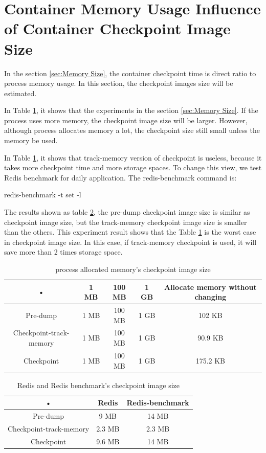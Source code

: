 \section{Container Memory Usage Influence of Container Checkpoint Image Size}
In the section \ref{sec:Memory Size}, the container checkpoint time is direct ratio to process memory usage. In this section, the checkpoint images size will be estimated.

In Table \ref{table:process image size}, it shows that the experiments in the section \ref{sec:Memory Size}. If the process uses more memory, the checkpoint image size will be larger. However, although process allocates memory a lot, the checkpoint size still small unless the memory be used.

In Table \ref{table:process image size}, it shows that track-memory version of checkpoint is useless, because it takes more checkpoint time and more storage spaces. To change this view, we test Redis benchmark for daily application. The redis-benchmark command is:
\begin{center}
redis-benchmark -t set -l
\end{center}

The results shown as table \ref{table:redis image size}, the pre-dump checkpoint image size is similar as checkpoint image size, but the track-memory checkpoint image size is smaller than the others. This experiment result shows that the Table \ref{table:process image size} is the worst case in checkpoint image size. In this case, if track-memory checkpoint is used, it will save more than 2 times storage space.

\begin{table}[hbtp]
\begin{center}
\begin{tabular}{|c|c|c|c|c|}\hline 
• & 1 MB & 100 MB & 1 GB & Allocate memory without changing\\ 
\hline 
Pre-dump & 1 MB & 100 MB & 1 GB & 102 KB\\ 
\hline 
Checkpoint-track-memory & 1 MB & 100 MB & 1 GB & 90.9 KB \\ 
\hline 
Checkpoint & 1 MB & 100 MB & 1 GB & 175.2 KB \\ 
\hline 
\end{tabular}
\caption{process allocated memory's checkpoint image size}
\label{table:process image size}
\end{center}
\end{table}

\begin{table}[hbtp]
\begin{center}
\begin{tabular}{|c|c|c|}
\hline 
• & Redis & Redis-benchmark \\ 
\hline 
Pre-dump & 9 MB & 14 MB \\ 
\hline 
Checkpoint-track-memory & 2.3 MB & 2.3 MB \\ 
\hline 
Checkpoint & 9.6 MB & 14 MB \\ 
\hline 
\end{tabular}
\caption{Redis and Redis benchmark's checkpoint image size}
\label{table:redis image size}
\end{center}
\end{table}
